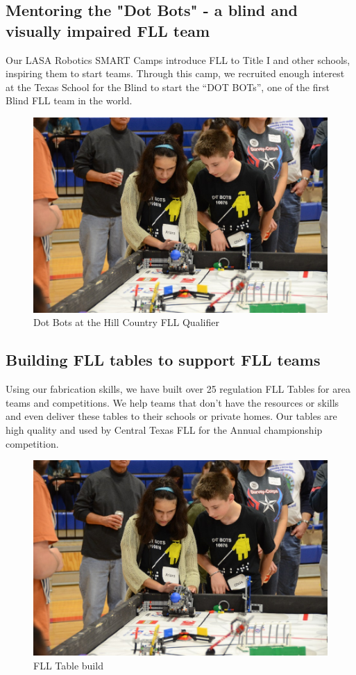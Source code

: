 \subsection{Mentoring the "Dot Bots" - a blind and visually impaired FLL team}
Our LASA Robotics SMART Camps introduce FLL to Title I and other schools, inspiring them to start teams. Through this camp, we recruited enough interest at the Texas School for the Blind to start the “DOT BOTs”, one of the first Blind FLL team in the world. 
\begin{figure}[H]
	\centering
	\includegraphics[width=0.6\linewidth]{dotbots}
	\caption[]{Dot Bots at the Hill Country FLL Qualifier}
	\label{fig:dotbots}
\end{figure}

\subsection{Building FLL tables to support FLL teams}
Using our fabrication skills, we have built over 25 regulation FLL Tables for area teams and competitions.   We help teams that don’t have the resources or skills and even deliver these tables to their schools or private homes.  Our tables are high quality and used by Central Texas FLL for the Annual championship competition.
\begin{figure}[H]
	\centering
	\includegraphics[width=0.6\linewidth]{tables}
	\caption[]{FLL Table build}
	\label{fig:tables}
\end{figure}

